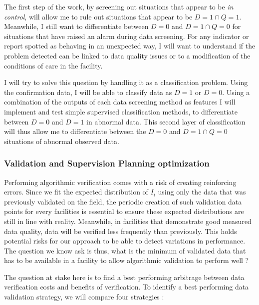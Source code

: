 The first step of the work, by screening out situations that appear to be \textit{in control}, will allow me to rule out situations that appear to be $D = 1 \cap Q = 1$. Meanwhile, I still want to differentiate between $D = 0$ and $D = 1 \cap Q = 0$ for situations that have raised an alarm during data screening. For any indicator or report spotted as behaving in an unexpected way, I will want to understand if the problem detected can be linked to data quality issues or to a modification of the conditions of care in the facility.

I will try to solve this question by handling it as a classification problem. Using the confirmation data, I will be able to classify data as $D = 1$ or $D = 0$. Using a combination of the outputs of each data screening method  as features I will implement and test simple supervised classification methods, to differentiate between $D = 0$ and $D = 1$ in abnormal data. This second layer of classification will thus allow me to differentiate between the $D = 0$ and $D = 1 \cap Q = 0$  situations of abnormal observed data.

\subsubsection{Validation and Supervision Planning optimization}

Performing algorithmic verification comes with a risk of creating reinforcing errors. Since we fit the expected distribution of $I_i$ using only the data that was previously validated on the field, the periodic creation of such validation data points for every facilities is essential to ensure these expected distributions are still in line with reality. Meanwhile, in facilities that demonstrate good measured data quality, data will be verified less frequently than previously. This holds potential risks for our approach to be able to detect variations in performance. The question we know ask is thus, what is the minimum of validated data that has to be available in a facility to allow algorithmic validation to perform well ?

The question at stake here is to find a best performing arbitrage between data verification costs and benefits of verification. To identify a best performing data validation strategy, we will compare four strategies :

